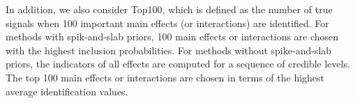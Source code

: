 \documentclass[12pt]{article}
\begin{document}

In addition, we also consider Top100, which is defined as the number of true signals when 100 important main effects (or interactions) are identified. For methods with spik-and-slab priors, 100 main effects or interactions are chosen with the highest inclusion probabilities. For methods without spike-and-slab priors, the indicators of all effects are computed for a sequence of credible levels. The top 100 main effects or interactions are chosen in terms of the highest average identification values.


\end{document}
